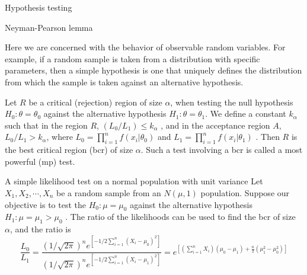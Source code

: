 \documentclass[8pt]{beamer}
\renewcommand{\emph}[1]{\textcolor{myorange}{#1}}
\begin{document}
\begin{frame}{Hypothesis testing}
    \begin{block}{Neyman-Pearson lemma}
    \end{block}
Here we are concerned with the behavior of observable random variables. For example, if a random sample is taken from a distribution with specific parameters, then a simple hypothesis is one that uniquely defines the distribution from which the sample is taken against an alternative hypothesis.

    Let $R$ be a critical (rejection) region of size $\alpha$, when testing the null hypothesis $H_0 : \theta = \theta_0$ against the alternative hypothesis $H_1 : \theta = \theta_1$. We define a constant $k_{\alpha}$ such that in the region $R$, $(L_0 /L_1 )\leq k_{\alpha}$ , and in the acceptance region $A$, $L_0/ L_1 > k_{\alpha}$, where $L_0 = \prod_{i=1}^n f (x_i | \theta_0 )$ and $L_1 = \prod_{i=1}^n f (x_i | \theta_1 )$ . Then $R$ is the \emph{best critical region (bcr)} of size $\alpha$. Such a test involving a \emph{bcr} is called a \emph{most powerful (mp) test}.

    \begin{exampleblock}{A simple likelihood test on a normal population with unit variance}
        Let $X_1 , X_2 , \cdots, X_n$ be a random sample from an $N (\mu, 1)$ population. Suppose our objective is to test the $H_0 : \mu = \mu_0$ against the alternative hypothesis $H_1 : \mu = \mu_1 > \mu_0$ . The ratio of the likelihoods can be used to find the \emph{bcr} of size $\alpha$, and the ratio is
        \[
            \frac{L_0}{L_1} = \frac{(1/\sqrt{2 \pi})^n e^{\left[-1/2 \sum_{i=1}^n ( X_i - \mu_0 )^2 \right]}}{(1/\sqrt{2 \pi})^n e^{\left[-1/2 \sum_{i=1}^n ( X_i - \mu_1 )^2 \right] }} = e^{\left[ \left(\sum_{i=1}^n X_i \right) (\mu_0 - \mu_1) + \frac{n}{2} \left( \mu_1^2 - \mu_0^2 \right) \right]}
        \]
    \end{exampleblock}
\end{frame}
\end{document}
